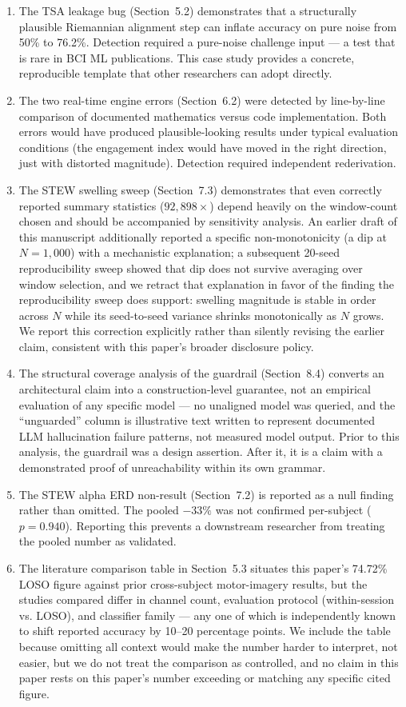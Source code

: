 \documentclass[11pt]{article}
\begin{document}
\begin{enumerate}[leftmargin=*]
\item The TSA leakage bug (Section~5.2) demonstrates that a structurally plausible Riemannian alignment step can inflate accuracy on pure noise from 50\% to 76.2\%. Detection required a pure-noise challenge input --- a test that is rare in BCI ML publications. This case study provides a concrete, reproducible template that other researchers can adopt directly.
\item The two real-time engine errors (Section~6.2) were detected by line-by-line comparison of documented mathematics versus code implementation. Both errors would have produced plausible-looking results under typical evaluation conditions (the engagement index would have moved in the right direction, just with distorted magnitude). Detection required independent rederivation.
\item The STEW swelling sweep (Section~7.3) demonstrates that even correctly reported summary statistics ($92{,}898\times$) depend heavily on the window-count chosen and should be accompanied by sensitivity analysis. An earlier draft of this manuscript additionally reported a specific non-monotonicity (a dip at $N=1{,}000$) with a mechanistic explanation; a subsequent 20-seed reproducibility sweep showed that dip does not survive averaging over window selection, and we retract that explanation in favor of the finding the reproducibility sweep does support: swelling magnitude is stable in order across $N$ while its seed-to-seed variance shrinks monotonically as $N$ grows. We report this correction explicitly rather than silently revising the earlier claim, consistent with this paper's broader disclosure policy.
\item The structural coverage analysis of the guardrail (Section~8.4) converts an architectural claim into a construction-level guarantee, not an empirical evaluation of any specific model --- no unaligned model was queried, and the ``unguarded'' column is illustrative text written to represent documented LLM hallucination failure patterns, not measured model output. Prior to this analysis, the guardrail was a design assertion. After it, it is a claim with a demonstrated proof of unreachability within its own grammar.
\item The STEW alpha ERD non-result (Section~7.2) is reported as a null finding rather than omitted. The pooled $-33\%$ was not confirmed per-subject ($p = 0.940$). Reporting this prevents a downstream researcher from treating the pooled number as validated.
\item The literature comparison table in Section~5.3 situates this paper's 74.72\% LOSO figure against prior cross-subject motor-imagery results, but the studies compared differ in channel count, evaluation protocol (within-session vs. LOSO), and classifier family --- any one of which is independently known to shift reported accuracy by 10--20 percentage points. We include the table because omitting all context would make the number harder to interpret, not easier, but we do not treat the comparison as controlled, and no claim in this paper rests on this paper's number exceeding or matching any specific cited figure.
\end{enumerate}
\end{document}
